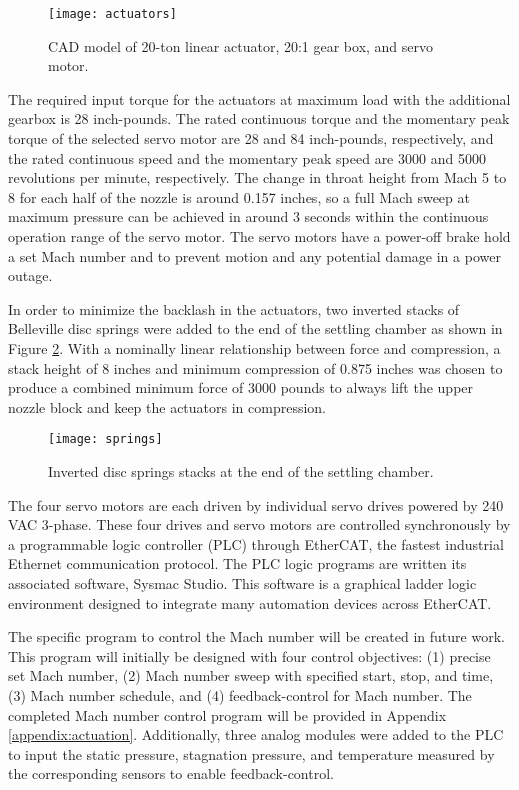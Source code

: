 \begin{figure}[ht]
    \centering
    \texttt{[image: actuators]}
    \caption{CAD model of 20-ton linear actuator, 20:1 gear box, and servo motor.}
    \label{fig:actuators}
\end{figure}

The required input torque for the actuators at maximum load with the additional gearbox is 28 inch-pounds. The rated continuous torque and the momentary peak torque of the selected servo motor are 28 and 84 inch-pounds, respectively, and the rated continuous speed and the momentary peak speed are 3000 and 5000 revolutions per minute, respectively. The change in throat height from Mach 5 to 8 for each half of the nozzle is around 0.157 inches, so a full Mach sweep at maximum pressure can be achieved in around 3 seconds within the continuous operation range of the servo motor. The servo motors have a power-off brake hold a set Mach number and to prevent motion and any potential damage in a power outage.

In order to minimize the backlash in the actuators, two inverted stacks of Belleville disc springs were added to the end of the settling chamber as shown in Figure \ref{fig:springs}. With a nominally linear relationship between force and compression, a stack height of 8 inches and minimum compression of 0.875 inches was chosen to produce a combined minimum force of 3000 pounds to always lift the upper nozzle block and keep the actuators in compression.

\begin{figure}[ht!]
    \centering
    \texttt{[image: springs]}
    \caption{Inverted disc springs stacks at the end of the settling chamber.}
    \label{fig:springs}
\end{figure}

The four servo motors are each driven by individual servo drives powered by 240 VAC 3-phase. These four drives and servo motors are controlled synchronously by a programmable logic controller (PLC) through EtherCAT, the fastest industrial Ethernet communication protocol. The PLC logic programs are written its associated software, Sysmac Studio. This software is a graphical ladder logic environment designed to integrate many automation devices across EtherCAT.

The specific program to control the Mach number will be created in future work. This program will initially be designed with four control objectives: (1) precise set Mach number, (2) Mach number sweep with specified start, stop, and time, (3) Mach number schedule, and (4) feedback-control for Mach number. The completed Mach number control program will be provided in Appendix \ref{appendix:actuation}. Additionally, three analog modules were added to the PLC to input the static pressure, stagnation pressure, and temperature measured by the corresponding sensors to enable feedback-control. 

